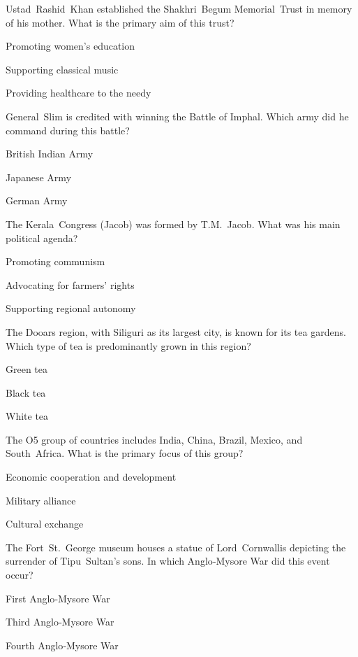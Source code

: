 \begin{enhancedmcq}{Ustad Rashid Khan established the Shakhri Begum Memorial Trust in memory of his mother. What is the primary aim of this trust?}
\item Promoting women's education
\item Supporting classical music
\item Providing healthcare to the needy

\end{enhancedmcq}
\begin{enhancedmcq}{General Slim is credited with winning the Battle of Imphal. Which army did he command during this battle?}
\item British Indian Army
\item Japanese Army
\item German Army

\end{enhancedmcq}
\begin{enhancedmcq}{The Kerala Congress (Jacob) was formed by T.M. Jacob. What was his main political agenda?}
\item Promoting communism
\item Advocating for farmers' rights
\item Supporting regional autonomy

\end{enhancedmcq}
\begin{enhancedmcq}{The Dooars region, with Siliguri as its largest city, is known for its tea gardens. Which type of tea is predominantly grown in this region?}
\item Green tea
\item Black tea
\item White tea

\end{enhancedmcq}
\begin{enhancedmcq}{The O5 group of countries includes India, China, Brazil, Mexico, and South Africa. What is the primary focus of this group?}
\item Economic cooperation and development
\item Military alliance
\item Cultural exchange

\end{enhancedmcq}
\begin{enhancedmcq}{The Fort St. George museum houses a statue of Lord Cornwallis depicting the surrender of Tipu Sultan's sons. In which Anglo‑Mysore War did this event occur?}
\item First Anglo‑Mysore War
\item Third Anglo‑Mysore War
\item Fourth Anglo‑Mysore War

\end{enhancedmcq}
